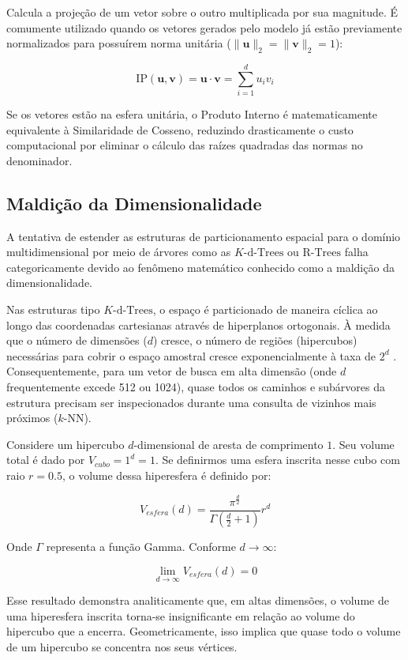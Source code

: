\documentclass[12pt]{article}
\begin{document}
	Calcula a projeção de um vetor sobre o outro multiplicada por sua magnitude. É comumente utilizado quando os vetores gerados pelo modelo já estão previamente normalizados para possuírem norma unitária ($\|\mathbf{u}\|_2 = \|\mathbf{v}\|_2 = 1$):
	
	$$\text{IP}(\mathbf{u}, \mathbf{v}) = \mathbf{u} \cdot \mathbf{v} = \sum_{i=1}^{d} u_i v_i$$
	
	Se os vetores estão na esfera unitária, o Produto Interno é matematicamente equivalente à Similaridade de Cosseno, reduzindo drasticamente o custo computacional por eliminar o cálculo das raízes quadradas das normas no denominador.

    \subsection{Maldição da Dimensionalidade}

    A tentativa de estender as estruturas de particionamento espacial para o domínio multidimensional por meio de árvores como as $K\text{-d}\text{-Trees}$ ou $\text{R-Trees}$ falha categoricamente devido ao fenômeno matemático conhecido como a maldição da dimensionalidade\cite{bellman1961adaptive}.

    Nas estruturas tipo $K\text{-d}\text{-Trees}$, o espaço é particionado de maneira cíclica ao longo das coordenadas cartesianas através de hiperplanos ortogonais. À medida que o número de dimensões ($d$) cresce, o número de regiões (hipercubos) necessárias para cobrir o espaço amostral cresce exponencialmente à taxa de $2^d$ \cite{weber1998quantitative}. Consequentemente, para um vetor de busca em alta dimensão (onde $d$ frequentemente excede 512 ou 1024), quase todos os caminhos e subárvores da estrutura precisam ser inspecionados durante uma consulta de vizinhos mais próximos ($k\text{-NN}$).

    Considere um hipercubo $d$-dimensional de aresta de comprimento $1$. Seu volume total é dado por $V_{cubo} = 1^d = 1$. Se definirmos uma esfera inscrita nesse cubo com raio $r = 0.5$, o volume dessa hiperesfera é definido por:
	
	$$V_{esfera}(d) = \frac{\pi^{\frac{d}{2}}}{\Gamma\left(\frac{d}{2} + 1\right)} r^d$$
	
	Onde $\Gamma$ representa a função Gamma. Conforme $d \rightarrow \infty$:
	
	$$\lim_{d \rightarrow \infty} V_{esfera}(d) = 0$$
	
	Esse resultado demonstra analiticamente que, em altas dimensões, o volume de uma hiperesfera inscrita torna-se insignificante em relação ao volume do hipercubo que a encerra. Geometricamente, isso implica que quase todo o volume de um hipercubo se concentra nos seus vértices.
    
\end{document}

